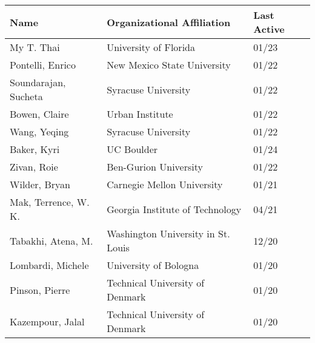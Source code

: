 \documentclass[localFont,alternative]{documentMETADATA}
\begin{document}
\centering
\begin{tabular}{lll}
\toprule
\textbf{Name} & \textbf{Organizational Affiliation} & \textbf{Last Active} \\
\midrule
		My T. Thai              & University of Florida								& 01/23 \\
		Pontelli, Enrico 			 	& New Mexico State University 				& 01/22 \\
		Soundarajan, Sucheta 		& Syracuse University 								& 01/22 \\
		Bowen, Claire 					& Urban Institute 										& 01/22 \\
		Wang, Yeqing 						& Syracuse University 								& 01/22 \\
		Baker, Kyri 						& UC Boulder 													& 01/24 \\
		Zivan, Roie 					  & Ben-Gurion University 							& 01/22 \\
		Wilder, Bryan 					& Carnegie Mellon University 					& 01/21 \\
		Mak, Terrence, W. K. 		& Georgia Institute of Technology 		& 04/21 \\
		Tabakhi, Atena, M. 			& Washington University in St. Louis  & 12/20 \\
		Lombardi, Michele 			& University of Bologna 							& 01/20 \\
		Pinson, Pierre 					& Technical University of Denmark 		& 01/20 \\
		Kazempour, Jalal 				& Technical University of Denmark 		& 01/20 \\
\bottomrule
\end{tabular}
\end{document}
